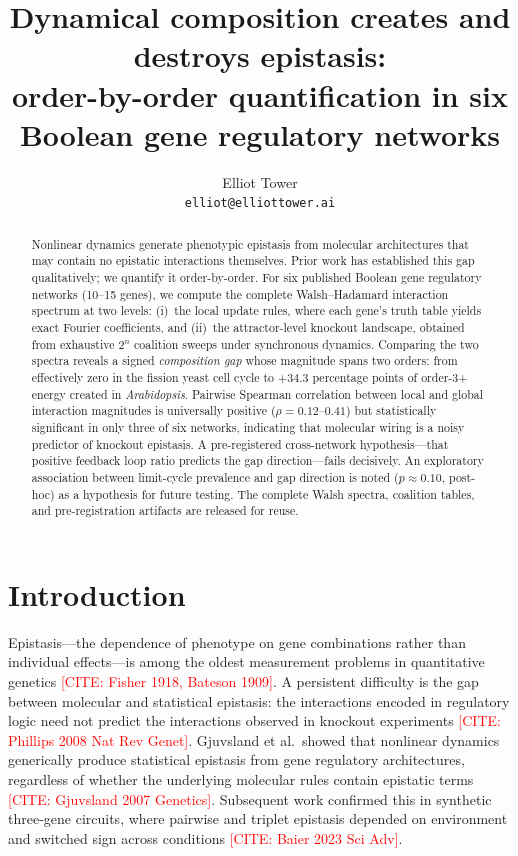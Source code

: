 \documentclass[11pt]{article}
\title{Dynamical composition creates and destroys epistasis:\\
order-by-order quantification in six Boolean gene regulatory networks}
\author{
  Elliot Tower \\
  \texttt{elliot@elliottower.ai}
}
\newcommand{\citeneeded}[1]{\textcolor{red}{[CITE: #1]}}
\begin{document}
\maketitle

\begin{abstract}
Nonlinear dynamics generate phenotypic epistasis from molecular
architectures that may contain no epistatic interactions themselves.
Prior work has established this gap qualitatively; we quantify it
order-by-order. For six published Boolean gene regulatory networks
(10--15 genes), we compute the complete Walsh--Hadamard interaction
spectrum at two levels: (i)~the local update rules, where each gene's
truth table yields exact Fourier coefficients, and (ii)~the
attractor-level knockout landscape, obtained from exhaustive $2^n$
coalition sweeps under synchronous dynamics. Comparing the two spectra
reveals a signed \emph{composition gap} whose magnitude spans two
orders: from effectively zero in the fission yeast cell cycle to
$+34.3$ percentage points of order-3+ energy created in
\emph{Arabidopsis}. Pairwise Spearman correlation between local and
global interaction magnitudes is universally positive
($\rho = 0.12$--$0.41$) but statistically significant in only three of
six networks, indicating that molecular wiring is a noisy predictor of
knockout epistasis. A pre-registered cross-network hypothesis---that
positive feedback loop ratio predicts the gap direction---fails
decisively. An exploratory association between limit-cycle prevalence
and gap direction is noted ($p \approx 0.10$, post-hoc) as a
hypothesis for future testing. The complete Walsh spectra, coalition
tables, and pre-registration artifacts are released for reuse.
\end{abstract}


\section{Introduction}
\label{sec:intro}

Epistasis---the dependence of phenotype on gene combinations rather
than individual effects---is among the oldest measurement problems in
quantitative genetics \citeneeded{Fisher 1918, Bateson 1909}. A
persistent difficulty is the gap between molecular and statistical
epistasis: the interactions encoded in regulatory logic need not
predict the interactions observed in knockout experiments
\citeneeded{Phillips 2008 Nat Rev Genet}. Gjuvsland et al.\ showed
that nonlinear dynamics generically produce statistical epistasis from
gene regulatory architectures, regardless of whether the underlying
molecular rules contain epistatic terms \citeneeded{Gjuvsland 2007
Genetics}. Subsequent work confirmed this in synthetic three-gene
circuits, where pairwise and triplet epistasis depended on environment
and switched sign across conditions \citeneeded{Baier 2023 Sci Adv}.
\end{document}
